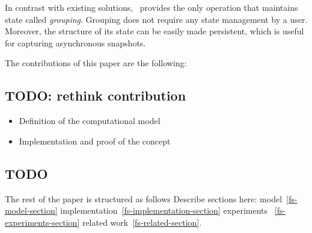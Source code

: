 In contrast with existing solutions, \FlameStream\ provides the only operation that maintains state called {\it grouping}. Grouping does not require any state management by a user. Moreover, the structure of its state can be easily made persistent, which is useful for capturing asynchronous snapshots.

The contributions of this paper are the following:

\subsection{TODO: rethink contribution}

\begin {itemize}
\item Definition of the computational model
\item Implementation and proof of the concept
\end {itemize}

\subsection{TODO}

The rest of the paper is structured as follows 
Describe sections here: model~\ref {fs-model-section}
implementation~\ref{fs-implementation-section}
experiments ~\ref{fs-experiments-section}
related work~\ref{fs-related-section}.


\endinput
